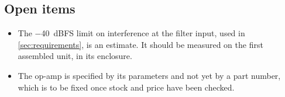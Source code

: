 \subsection{Open items}

\begin{itemize}
  \item The \qty{-40}{dBFS} limit on interference at the filter input, used
        in \cref{sec:requirements}, is an estimate. It should be measured on
        the first assembled unit, in its enclosure.
  \item The op-amp is specified by its parameters and not yet by a part
        number, which is to be fixed once stock and price have been checked.
\end{itemize}
